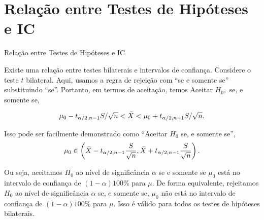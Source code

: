 \documentclass[12pt]{beamer}
\begin{document}
\section{Relação entre Testes de Hipóteses e IC}
\begin{frame}{Relação entre Testes de Hipóteses e IC}
\begin{block}{}
\justifying
Existe uma relação entre testes bilaterais e intervalos de confiança. Considere o teste $t$ bilateral. Aqui, usamos a regra de rejeição com ``se e somente se'' substituindo ``se''. Portanto, em termos de aceitação, temos Aceitar $H_0,$ se, e somente se,

\begin{align*}
\mu_0 - t_{\alpha/2, n-1}S/\sqrt{n} < \Bar{X} < \mu_0 + t_{\alpha/2, n-1}S/\sqrt{n}.
\end{align*}
\end{block}
\pause
\begin{block}{}
Isso pode ser facilmente demonstrado como ``Aceitar $H_0$ se, e somente se'',
\begin{align*}
\mu_0 \in \left(\Bar{X} - t_{\alpha/2, n-1}\frac{S}{\sqrt{n}}, \Bar{X} + t_{\alpha/2, n-1}\frac{S}{\sqrt{n}}\right).
\end{align*}
\end{block}
\end{frame}

\begin{frame}{}
\begin{block}{}
\justifying
Ou seja, aceitamos $H_0$ ao nível de significância $\alpha$ se e somente se $\mu_0$ está no intervalo de confiança de $(1 - \alpha)100\%$ para $\mu$. De forma equivalente, rejeitamos $H_0$ ao nível de significância $\alpha$ se, e somente se, $\mu_0$ não está no intervalo de confiança de $(1 - \alpha)100\%$ para $\mu$. Isso é válido para todos os testes de hipóteses bilaterais.
\end{block}
\end{frame}
\end{document}
